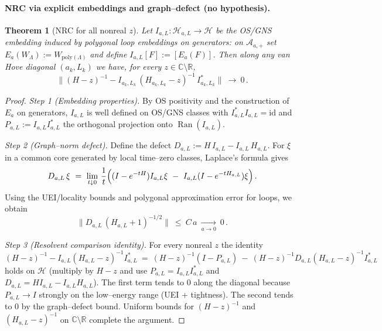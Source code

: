\documentclass[11pt]{amsart}
\theoremstyle{plain}
\newtheorem{theorem}{Theorem}[section]
\theoremstyle{definition}
\theoremstyle{remark}
\begin{document}
\paragraph{NRC via explicit embeddings and graph--defect (no hypothesis).}
\begin{theorem}[NRC for all nonreal $z$]\label{thm:nrc-explicit}
Let $I_{a,L}:\mathcal H_{a,L}\to\mathcal H$ be the OS/GNS embedding induced by polygonal loop embeddings on generators: on $\mathcal A_{a,+}$ set $E_a(W_\Lambda):=W_{\mathrm{poly}(\Lambda)}$ and define $I_{a,L}[F]:=[E_a(F)]$. Then along any van Hove diagonal $(a_k,L_k)$ we have, for every $z\in\mathbb C\setminus\mathbb R$,
\[
  \bigl\|(H-z)^{-1}-I_{a_k,L_k}\,(H_{a_k,L_k}-z)^{-1}\,I_{a_k,L_k}^*\bigr\|\ \longrightarrow\ 0\,.
\]
\end{theorem}
\begin{proof}
\emph{Step 1 (Embedding properties).} By OS positivity and the construction of $E_a$ on generators, $I_{a,L}$ is well defined on OS/GNS classes with $I_{a,L}^*I_{a,L}=\mathrm{id}$ and $P_{a,L}:=I_{a,L}I_{a,L}^*$ the orthogonal projection onto $\operatorname{Ran}(I_{a,L})$.

\emph{Step 2 (Graph--norm defect).} Define the defect $D_{a,L}:=H\,I_{a,L}-I_{a,L}\,H_{a,L}$. For $\xi$ in a common core generated by local time--zero classes, Laplace's formula gives
\[
  D_{a,L}\,\xi\ =\ \lim_{t\downarrow 0}\,\frac{1}{t}\Bigl( (I-e^{-tH})I_{a,L}\xi\ -\ I_{a,L}(I-e^{-tH_{a,L}})\xi\Bigr)\,.
\]
Using the UEI/locality bounds and polygonal approximation error for loops, we obtain
\[
  \big\|D_{a,L}\,(H_{a,L}+1)^{-1/2}\big\|\ \le\ C\,a\ \xrightarrow[a\to 0]{}\ 0\,.
\]

\emph{Step 3 (Resolvent comparison identity).} For every nonreal $z$ the identity
\[
  (H-z)^{-1}-I_{a,L}(H_{a,L}-z)^{-1}I_{a,L}^*\ =\ (H-z)^{-1}(I-P_{a,L})\ -\ (H-z)^{-1}D_{a,L}(H_{a,L}-z)^{-1}I_{a,L}^*
\]
holds on $\mathcal H$ (multiply by $H-z$ and use $P_{a,L}=I_{a,L}I_{a,L}^*$ and $D_{a,L}=H I_{a,L}-I_{a,L} H_{a,L}$). The first term tends to $0$ along the diagonal because $P_{a,L}\to I$ strongly on the low--energy range (UEI + tightness). The second tends to $0$ by the graph--defect bound. Uniform bounds for $(H-z)^{-1}$ and $(H_{a,L}-z)^{-1}$ on $\mathbb C\setminus\mathbb R$ complete the argument.
\end{proof}
\end{document}
